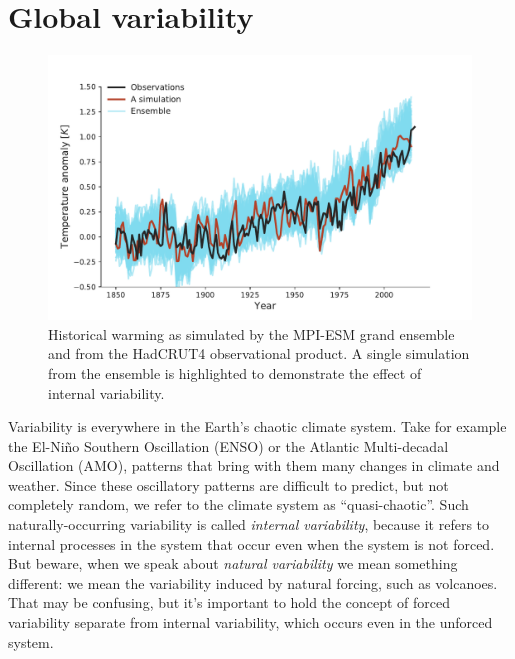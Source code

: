 \documentclass[12pt]{book}
\begin{document}
\chapter{Global variability}
\label{chapter:global_variability}

\begin{figure}
	\begin{center}
		\includegraphics[width=16 cm]{../plots/Variability02.pdf}
	\end{center}
	\caption{  Historical warming as simulated by the MPI-ESM grand ensemble and from the HadCRUT4 observational product. A single simulation from the ensemble is highlighted to demonstrate the effect of internal variability.  } 
	\label{fig:variability_02}
\end{figure}

Variability is everywhere in the Earth's chaotic climate system.  Take for example the El-Ni\~no Southern Oscillation (ENSO) or the Atlantic Multi-decadal Oscillation (AMO), patterns that bring with them many changes in climate and weather. Since these oscillatory patterns are difficult to predict, but not completely random, we refer to the climate system as ``quasi-chaotic''. Such naturally-occurring variability is called \textit{internal variability}, because it refers to internal processes in the system that occur even when the system is not forced. But beware, when we speak about \textit{natural variability} we mean something different: we mean the variability induced by natural forcing, such as volcanoes. That may be confusing, but it's important to hold the concept of forced variability separate from internal variability, which occurs even in the unforced system.
\end{document}
